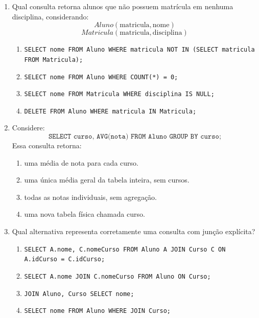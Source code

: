 \documentclass[12pt,a4paper]{article}
\begin{document}
\begin{enumerate}[resume,label=\textbf{Q\arabic*.}]
\begin{enumerate}[label=\alph*)]
    \item Bruno.
    \item Ana.
    \item Carla.
    \item O resultado não pode ser ordenado por nota.
\end{enumerate}

\item Qual consulta retorna alunos que não possuem matrícula em nenhuma disciplina, considerando:
\[
Aluno(\text{matricula}, \text{nome})
\]
\[
Matricula(\text{matricula}, \text{disciplina})
\]

\begin{enumerate}[label=\alph*)]
    \item \texttt{SELECT nome FROM Aluno WHERE matricula NOT IN (SELECT matricula FROM Matricula);}
    \item \texttt{SELECT nome FROM Aluno WHERE COUNT(*) = 0;}
    \item \texttt{SELECT nome FROM Matricula WHERE disciplina IS NULL;}
    \item \texttt{DELETE FROM Aluno WHERE matricula IN Matricula;}
\end{enumerate}

\item Considere:
\[
\texttt{SELECT curso, AVG(nota) FROM Aluno GROUP BY curso;}
\]
Essa consulta retorna:

\begin{enumerate}[label=\alph*)]
    \item uma média de nota para cada curso.
    \item uma única média geral da tabela inteira, sem cursos.
    \item todas as notas individuais, sem agregação.
    \item uma nova tabela física chamada curso.
\end{enumerate}

\item Qual alternativa representa corretamente uma consulta com junção explícita?

\begin{enumerate}[label=\alph*)]
    \item \texttt{SELECT A.nome, C.nomeCurso FROM Aluno A JOIN Curso C ON A.idCurso = C.idCurso;}
    \item \texttt{SELECT A.nome JOIN C.nomeCurso FROM Aluno ON Curso;}
    \item \texttt{JOIN Aluno, Curso SELECT nome;}
    \item \texttt{SELECT nome FROM Aluno WHERE JOIN Curso;}
\end{enumerate}


\end{enumerate}
\end{document}
